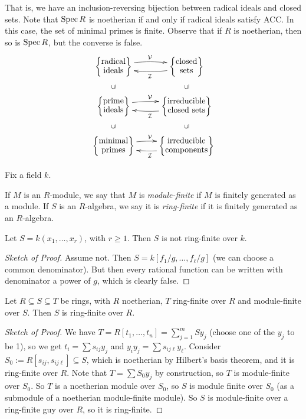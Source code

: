  That is, we have an inclusion-reversing bijection between radical ideals and closed
 sets. Note that $\operatorname{Spec} R$ is noetherian if and only if radical ideals satisfy ACC. In
 this case, the set of minimal primes is finite. Observe that if $R$ is noetherian, then
 so is $\operatorname{Spec} R$, but the converse is false.
 \[\xymatrix @R=1.5pc{
 \left\{\raisebox{4pt}{\txt{radical\\ ideals}}\right\}\ar@/^/[r]^\V \ar@{<-}@/_/[r]_\I
 & \left\{\raisebox{4pt}{\txt{closed\\ sets}}\right\}\\
 \left\{\raisebox{4pt}{\txt{prime\\ ideals}}\right\}\ar@/^/[r]^\V \ar@{<-}@/_/[r]_\I \ar@{}[u]|{\cup \rule{.3pt}{5pt}}
 & \left\{\raisebox{4pt}{\txt{irreducible\\ closed sets}}\right\} \ar@{}[u]|{\cup \rule{.3pt}{5pt}}\\
 \left\{\raisebox{3pt}{\txt{minimal\\ primes}}\right\}\ar@/^/[r]^\V \ar@{<-}@/_/[r]_\I \ar@{}[u]|{\cup \rule{.3pt}{5pt}}&
 \left\{\raisebox{3pt}{\txt{irreducible\\ components}}\right\} \ar@{}[u]|{\cup \rule{.3pt}{5pt}}
 }\]

 Fix a field $k$.
 \begin{definition}
   If $M$ is an $R$-module, we say that $M$ is \emph{module-finite} if $M$ is finitely
   generated as a module. If $S$ is an $R$-algebra, we say it is \emph{ring-finite} if it
   is finitely generated as an $R$-algebra.
 \end{definition}
 \begin{lemma} \label{lec19L:funcfieldnfin}
   Let $S=k(x_1,\dots, x_r)$, with $r\ge 1$. Then $S$ is not ring-finite over $k$.
 \end{lemma}
 \begin{proof}[Sketch of Proof]
   Assume not. Then $S=k[f_1/g,\dots, f_\ell/g]$ (we can choose a common denominator).
   But then every rational function can be written with denominator a power of $g$, which
   is clearly false.
 \end{proof}
 \begin{theorem}
   Let $R\subseteq S\subseteq T$ be rings, with  $R$ noetherian, $T$ ring-finite
   over $R$ and module-finite over $S$. Then $S$ is ring-finite over $R$.
 \end{theorem}
 \begin{proof}[Sketch of Proof]
   We have $T=R[t_1,\dots, t_n]=\sum_{j=1}^m Sy_j$ (choose one of the $y_j$ to be 1), so we
   get $t_i=\sum s_{ij} y_j$ and $y_iy_j=\sum s_{ij\ell} y_\ell$. Consider
   $S_0:=R[s_{ij},s_{ij\ell}]\subseteq S$, which is noetherian by Hilbert's basis
   theorem, and it is ring-finite over $R$. Note that $T=\sum S_0 y_j$ by construction,
   so $T$ is module-finite over $S_0$. So $T$ is a noetherian module over $S_0$, so $S$
   is module finite over $S_0$ (as a submodule of a noetherian module-finite module). So
   $S$ is module-finite over a ring-finite guy over $R$, so it is ring-finite.
 \end{proof}
